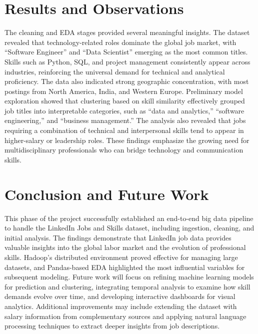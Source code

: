 \documentclass[conference]{IEEEtran}
\begin{document}
\section{\textbf{Results and Observations}}
The cleaning and EDA stages provided several meaningful insights. The dataset revealed that technology-related roles dominate the global job market, with “Software Engineer” and “Data Scientist” emerging as the most common titles. Skills such as Python, SQL, and project management consistently appear across industries, reinforcing the universal demand for technical and analytical proficiency. The data also indicated strong geographic concentration, with most postings from North America, India, and Western Europe.
Preliminary model exploration showed that clustering based on skill similarity effectively grouped job titles into interpretable categories, such as “data and analytics,” “software engineering,” and “business management.” The analysis also revealed that jobs requiring a combination of technical and interpersonal skills tend to appear in higher-salary or leadership roles. These findings emphasize the growing need for multidisciplinary professionals who can bridge technology and communication skills.


\section{\textbf{Conclusion and Future Work}}
This phase of the project successfully established an end-to-end big data pipeline to handle the LinkedIn Jobs and Skills dataset, including ingestion, cleaning, and initial analysis. The findings demonstrate that LinkedIn job data provides valuable insights into the global labor market and the evolution of professional skills. Hadoop’s distributed environment proved effective for managing large datasets, and Pandas-based EDA highlighted the most influential variables for subsequent modeling.
Future work will focus on refining machine learning models for prediction and clustering, integrating temporal analysis to examine how skill demands evolve over time, and developing interactive dashboards for visual analytics. Additional improvements may include extending the dataset with salary information from complementary sources and applying natural language processing techniques to extract deeper insights from job descriptions.
\end{document}
